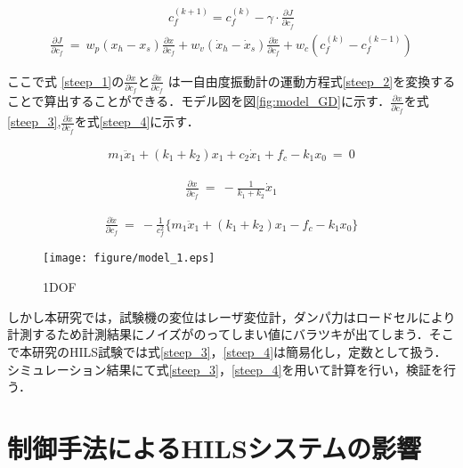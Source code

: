 \documentclass[a4paper,12pt]{article_vdlab_sotsuron}
\begin{document}
\begin{eqnarray}
 c^{(k+1)}_{f} = c^{(k)}_{f} - \gamma \cdotp \frac{\partial J}{\partial c_{f}}
 \label{steep1}
\end{eqnarray}
%
\begin{eqnarray}
  \frac{\partial J}{\partial c_{f}} \ =\ w_{p}( x_{h} -x_{s})\frac{\partial x}{\partial c_{f}} +w_{v}(\dot{x}_{h} -\dot{x}_{s})\frac{\partial \dot{x}}{\partial c_{f}} +w_{c}( c^{(k)}_{f} -c^{(k-1)}_{f})
 \label{steep_1}
\end{eqnarray}

ここで式 \ref{steep_1}の$\frac{\partial x}{\partial c_{f}}$と$\frac{\partial \dot{x}}{\partial c_{f}}$
は一自由度振動計の運動方程式\ref{steep_2}を変換することで算出することができる．モデル図を図\ref{fig:model_GD}に示す．$\frac{\partial x}{\partial c_{f}}$を式\ref{steep_3},$\frac{\partial \dot{x}}{\partial c_{f}}$を式\ref{steep_4}に示す．

\begin{eqnarray}
 m_{1}\ddot{x}_{1} +( k_{1} +k_{2}) x_{1} +c_{2}\dot{x}_{1} +f_{c} -k_{1} x_{0} \ =\ 0
 \label{steep_2}
\end{eqnarray}


\begin{eqnarray}
\frac{\partial x}{\partial c_{f}} \ =\ -\frac{1}{k_{1} +k_{2}}\dot{x}_{1}
\label{steep_3}
\end{eqnarray}

\begin{eqnarray}
\frac{\partial \dot{x}}{\partial c_{f}} \ =\ -\frac{1}{c^{2}_{f}}\{m_{1}\ddot{x}_{1} +( k_{1} +k_{2}) x_{1} -f_{c} -k_{1} x_{0}\}
\label{steep_4}
\end{eqnarray}

\begin{figure}[h]
  \begin{center}
    \texttt{[image: figure/model\_1.eps]}
    \vspace*{3mm}
    \caption{1DOF}
    \label{fig:model_1dof_GD}
  \end{center}
\end{figure}
しかし本研究では，試験機の変位はレーザ変位計，ダンパ力はロードセルにより計測するため計測結果にノイズがのってしまい値にバラツキが出てしまう．そこで本研究のHILS試験では式\ref{steep_3}，\ref{steep_4}は簡易化し，定数として扱う．シミュレーション結果にて式\ref{steep_3}，\ref{steep_4}を用いて計算を行い，検証を行う．

\newpage
\section{制御手法によるHILSシステムの影響}
\end{document}
